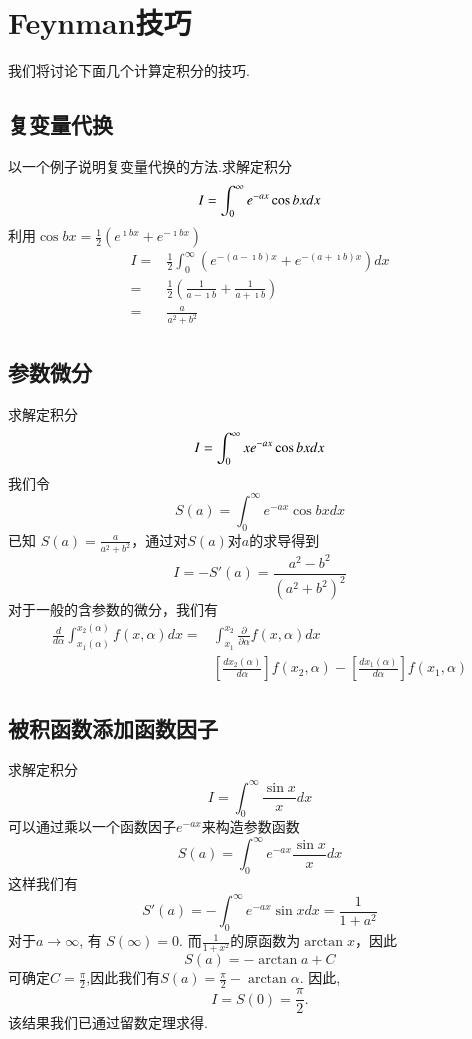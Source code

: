 \section{Feynman技巧}
我们将讨论下面几个计算定积分的技巧.

\subsection{复变量代换}
以一个例子说明复变量代换的方法.求解定积分
\[
    I =  \int_0^{\infty} e^{-a x} \cos b x d x \\
\]
利用$\cos{bx} = \frac{1}{2}\left( e^{\imath b x} + e^{-\imath bx}\right)$
\[    \begin{aligned}
    I= & \frac{1}{2} \int_{0}^{\infty} \left(e^{-(a-\imath b) x} + e^{-(a + \imath b) x} \right)  d x \\
    = & \frac{1}{2} \left( \frac{1}{a-\imath b} +  \frac{1}{a+\imath b} \right)\\
    = & \frac{a}{a^2+b^2}
\end{aligned}
\]

\subsection{参数微分}
求解定积分
\[
    I =  \int_0^{\infty} x e^{-a x} \cos b x d x \\
\]
我们令
\[
  S(a) =   \int_0^{\infty} e^{-a x} \cos b x d x 
\]
已知 $S(a) = \frac{a}{a^2+b^2}$，通过对$S(a)$对$a$的求导得到
\[
    I = - S'(a)  = \frac{a^2 - b^2}{(a^2 +b^2)^2}    
\]
对于一般的含参数的微分，我们有
\begin{equation}
    \begin{aligned}
    \frac{d}{d \alpha} \int_{x_1(\alpha)}^{x_2(\alpha)} f(x, \alpha) d x= & \int_{x_1}^{x_2} \frac{\partial}{\partial \alpha} f(x, \alpha) d x \\
    & \left[\frac{d x_2(\alpha)}{d \alpha} \right] f(x_2, \alpha)- 
    \left[\frac{d x_1(\alpha)}{d \alpha}\right] f(x_1, \alpha)
    \end{aligned}
\end{equation}

\subsection{被积函数添加函数因子}
求解定积分
\[
    I =  \int_0^{\infty} \frac{\sin{x}}{x} d x 
\]
可以通过乘以一个函数因子$e^{-a x}$来构造参数函数
\[
 S(a) =     \int_0^{\infty}  e^{-a x} \frac{\sin{x}}{x} d x 
\]
这样我们有
\[
  S'(a) = -  \int_0^{\infty}  e^{-a x} \sin{x} d x  = \frac{1}{1+a^2}
\]
对于$a \to \infty$, 有 $S(\infty) = 0$.
而$\frac{1}{1+x^2}$的原函数为$\arctan{x}$，因此
\[S(a) = - \arctan{a} + C\]
可确定$C = \frac{\pi}{2}$,因此我们有$S(a) = \frac{\pi}{2} - \arctan{\alpha}$.
因此,
\[
  I = S(0) = \frac{\pi}{2} .    
\]
该结果我们已通过留数定理求得.